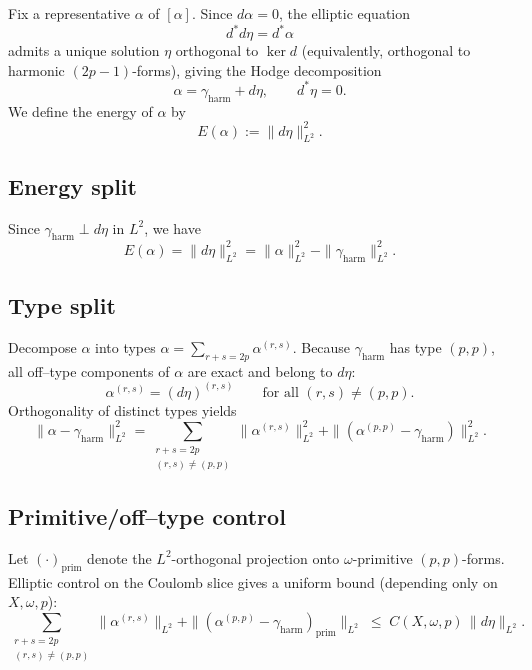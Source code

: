 \documentclass[11pt]{article}
\newcommand{\REVMZ}[1]{\textcolor{teal}{#1}}  %
\numberwithin{equation}{section}  %
\theoremstyle{plain}
\theoremstyle{definition}
\theoremstyle{remark}
\newcommand{\harm}{\mathrm{harm}}
\newcommand{\prim}{\mathrm{prim}}
\begin{document}
\smallskip
Fix a representative \(\alpha\) of \([\alpha]\).  Since \(d\alpha=0\), the elliptic equation
\[
d^{*}d\eta = d^{*}\alpha
\]
admits a unique solution \(\eta\) orthogonal to \(\ker d\) (equivalently, orthogonal to harmonic \((2p-1)\)-forms), giving the Hodge decomposition \REVMZ{\cite{Wells,Voisin02}}
\[
\alpha = \gamma_{\harm} + d\eta,
\qquad d^*\eta=0.
\]
We define the energy of \(\alpha\) by
\[
E(\alpha):=\|d\eta\|_{L^{2}}^{2}.
\]

\subsection*{Energy split}
Since \(\gamma_{\harm}\perp d\eta\) in \(L^2\), we have
\begin{equation}\label{eq:energy-split}
	E(\alpha)
	= \|d\eta\|_{L^{2}}^{2}
	= \|\alpha\|_{L^{2}}^{2} - \|\gamma_{\harm}\|_{L^{2}}^{2}.
	\tag{11}
\end{equation}

\subsection*{Type split}
Decompose \(\alpha\) into types \(\alpha=\sum_{r+s=2p}\alpha^{(r,s)}\).
Because \(\gamma_{\harm}\) has type \((p,p)\), all off--type components of \(\alpha\) are exact and belong to \(d\eta\):
\[
\alpha^{(r,s)}=(d\eta)^{(r,s)}
\qquad\text{for all }(r,s)\neq(p,p).
\]
Orthogonality of distinct types yields
\begin{equation}\label{eq:type-split}
	\|\alpha-\gamma_{\harm}\|_{L^{2}}^{2}
	=
	\sum_{\substack{r+s=2p\\(r,s)\neq(p,p)}}\|\alpha^{(r,s)}\|_{L^{2}}^{2}
	+\|(\alpha^{(p,p)}-\gamma_{\harm})\|_{L^{2}}^{2}.
	\tag{12}
\end{equation}

\subsection*{Primitive/off--type control}
Let \((\cdot)_{\prim}\) denote the \(L^2\)-orthogonal projection onto \(\omega\)-primitive \((p,p)\)-forms.
Elliptic control on the Coulomb slice gives a uniform bound (depending only on \(X,\omega,p\)):
\begin{equation}\label{eq:primitive-control}
	\sum_{\substack{r+s=2p\\(r,s)\neq(p,p)}}\|\alpha^{(r,s)}\|_{L^{2}}
	+\|(\alpha^{(p,p)}-\gamma_{\harm})_{\prim}\|_{L^{2}}
	\;\le\;
	C(X,\omega,p)\,\|d\eta\|_{L^{2}}.
	\tag{13}
\end{equation}
\end{document}

